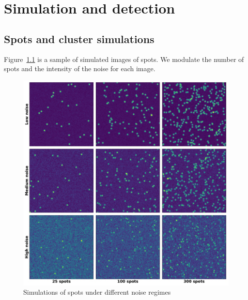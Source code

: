 
\graphicspath{{../../figures/appendix/}}

\chapter{Simulation and detection} \label{ch:appendix_simulation_detection}

\newpage

\section{Spots and cluster simulations} \label{sec:appendix_simulations}

\vfill

Figure~\ref{fig:spots_mosaic} is a sample of simulated images of spots.
We modulate the number of spots and the intensity of the noise for each image.

\vfill

\begin{figure}[h]
    \centering
    \includegraphics[width=\textwidth]{figures/appendix/spots_mosaic}
    \caption{Simulations of spots under different noise regimes}
    \label{fig:spots_mosaic}
\end{figure}

\newpage

